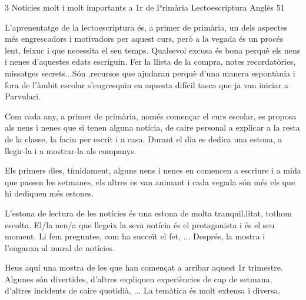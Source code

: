 %
%
\begin{news}
{3} %
{Notícies molt i molt importants a 1r de Primària}
{Lectoescriptura}
{Anglès}
{51} %


L'aprenentatge de la lectoescriptura és, a primer de primària, un dels aspectes més engrescadors i motivadors per aquest curs, però a la vegada és un procés lent, feixuc i que necessita el seu temps. Qualsevol excusa és bona perquè els nens i nenes d'aquestes edats escriguin. Fer la llista de la compra, notes recordatòries, missatges secrets...Són ,recursos que ajudaran perquè d'una manera espontània i fora de l'àmbit escolar s'engresquin en aquesta difícil tasca que ja van iniciar a Parvulari.

Com cada any, a primer de primària, només començar el curs escolar, es proposa als nens i nenes que si tenen alguna notícia, de caire personal a explicar a la resta de la classe, la facin per escrit i a casa. Durant el  dia es dedica una estona, a llegir-la i a mostrar-la als companys. 

Els primers dies, tímidament, alguns nens i nenes en comencen a escriure i a mida que passen les setmanes, els altres es van animant i cada vegada són més els que hi dediquen més estones.

L'estona de lectura de les notícies és una estona de molta tranquil.litat, tothom escolta. El/la nen/a que llegeix la seva notícia és el protagonista i és el seu moment. Li fem preguntes, com ha succeït el fet, ... Després, la mostra i l'enganxa al mural de notícies.

Heus aquí una mostra de les que han començat a arribar aquest 1r trimestre. Algunes són divertides, d'altres expliquen experiències de cap de setmana, d'altres incidents de caire quotidià, ... La temàtica és molt extensa i diversa.


\noindent{}
\noindent{}
\noindent{}
\noindent{}
\noindent{}
\noindent{}
\noindent{}
\noindent{}

\end{news}
